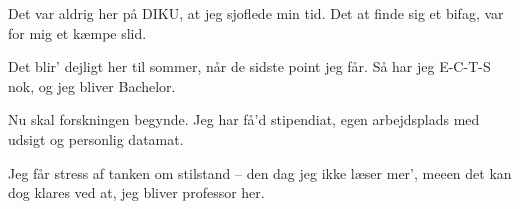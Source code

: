 \documentclass[a4paper]{article}
\begin{document}
\begin{song}[Kapitalismen]
  Det var aldrig her på DIKU,
  at jeg sjoflede min tid.
  Det at finde sig et bifag,
  var for mig et kæmpe slid.

  Det blir' dejligt her til sommer,
  når de sidste point jeg får.
  Så har jeg E-C-T-S nok,
  og jeg bliver Bachelor.
\end{song}



\begin{song}
  Nu skal forskningen begynde.
  Jeg har få'd stipendiat,
  egen arbejdsplads med udsigt
  og personlig datamat.

  Jeg får stress af tanken om stilstand --
  den dag jeg ikke læser mer',
  meeen det kan dog klares ved at,
  jeg bliver professor her.
\end{song}

\end{document}
